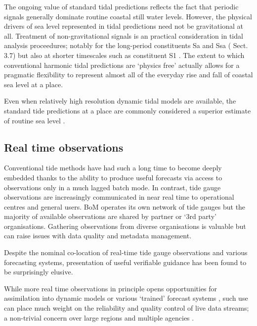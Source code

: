 The ongoing value of standard tidal predictions reflects the fact that periodic signals generally dominate routine coastal still water levels.
However, the physical drivers of sea level represented in tidal predictions need not be gravitational at all.
Treatment of non-gravitational signals is an practical consideration in tidal analysis proceedures; notably for the long-period constituents Sa and Ssa (\citep[]{Parker:2007wq} Sect. 3.7) but also at shorter timescales such as constituent S1 \citep{Ray:2004ts}.
The extent to which conventional harmonic tidal predictions are `physics free' actually allows for a pragmatic flexibility to represent almost all of the everyday rise and fall of coastal sea level at a place.

Even when relatively high resolution dynamic tidal models are available, the standard tide predictions at a place are commonly considered a superior estimate of routine sea level \citep{Horsburgh:2008gw,Egbert:1996vr}.


\subsection{Real time observations}
Conventional tide methods have had such a long time to become deeply embedded \citep{Cartwright:2000tt} thanks to the ability to produce useful forecasts via access to observations only in a much lagged batch mode.  
In contrast, tide gauge observations are increasingly communicated in near real time to operational centres and general users. 
BoM operates its own network of tide gauges \citep{Greenslade:2012um} but the majority of available observations are shared by partner or `3rd party' organisations. 
Gathering observations from diverse organisations is valuable but can raise issues with data quality and metadata management.

Despite the nominal co-location of real-time tide gauge observations and various forecasting systems, presentation of useful verifiable guidance has been found to be surprisingly elusive.     

While more real time observations in principle opens opportunities for assimilation into dynamic models or various `trained' forecast systems \citep{Horsburgh:2011th}, such use can place much weight on the reliability and quality control of live data streams; a non-trivial concern over large regions and multiple agencies \citep{Mourre:2006hz}.


